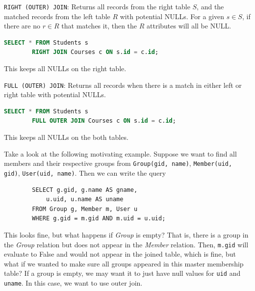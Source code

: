     \begin{definition}
      \label{def:right-outer-join-2}
      \texttt{RIGHT (OUTER) JOIN}: Returns all records from the right table $S$, and the matched records from the left table $R$ with potential NULLs. For a given $s \in S$, if there are no $r \in R$ that matches it, then the $R$ attributes will all be NULL. 
      \begin{lstlisting}[language=SQL]
        SELECT * FROM Students s
        RIGHT JOIN Courses c ON s.id = c.id;
      \end{lstlisting}
      This keeps all NULLs on the right table. 
    \end{definition}

    \begin{definition}
      \label{def:full-outer-join-2}
      \texttt{FULL (OUTER) JOIN}: Returns all records when there is a match in either left or right table with potential NULLs.
      \begin{lstlisting}[language=SQL]
        SELECT * FROM Students s
        FULL OUTER JOIN Courses c ON s.id = c.id;
      \end{lstlisting}
      This keeps all NULLs on the both tables. 
    \end{definition}

    \begin{example}
      \label{ex:motivation-for-outer-join}
      Take a look at the following motivating example. Suppose we want to find all members and their respective groups from \texttt{Group(gid, name)}, \texttt{Member(uid, gid)}, \texttt{User(uid, name)}. Then we can write the query 
      \begin{lstlisting}
        SELECT g.gid, g.name AS gname, 
            u.uid, u.name AS uname 
        FROM Group g, Member m, User u 
        WHERE g.gid = m.gid AND m.uid = u.uid; 
      \end{lstlisting}
      This looks fine, but what happens if \textit{Group} is empty? That is, there is a group in the \textit{Group} relation but does not appear in the \textit{Member} relation. Then, \texttt{m.gid} will evaluate to False and would not appear in the joined table, which is fine, but what if we wanted to make sure all groups appeared in this master membership table? If a group is empty, we may want it to just have null values for \texttt{uid} and \texttt{uname}. In this case, we want to use outer join. 
    \end{example}

